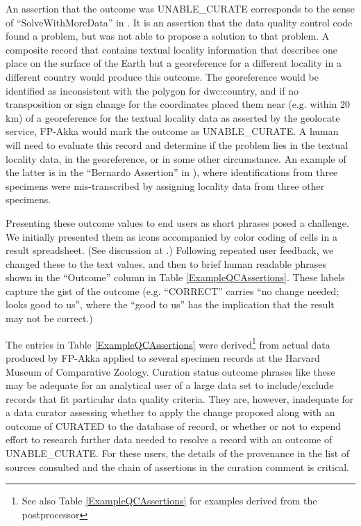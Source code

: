 \documentclass{article}
\begin{document}
An assertion that the outcome was UNABLE\_CURATE corresponds to the sense of ``SolveWithMoreData'' in \citep{morris_semantic_2013}.  It is an assertion that the data quality control code found a problem, but was not able to propose a solution to that problem.  
A composite record that contains textual locality information that describes one place on the surface of the Earth but a georeference for a different locality in a different country would produce this outcome.
The georeference would be identified as inconsistent with the polygon for dwc:country, and if no transposition or sign change for the coordinates placed them near (e.g. within 20 km) of a georeference for the textual locality data as asserted by the geolocate service, FP-Akka would mark the outcome as UNABLE\_CURATE.  
A human will need to evaluate this record and determine if the problem lies in the textual locality data, in the georeference, or in some other circumstance.
An example of the latter is in the ``Bernardo Assertion'' in \citep{morris_semantic_2013}), where identifications from three specimens were mis-transcribed by assigning locality data from three other specimens.

Presenting these outcome values to end users as short phrases posed a challenge.
We initially presented them as icons accompanied by color coding of cells in a result spreadsheet. (See discussion at \citep{FPWiki_ResultTypes}.)  Following repeated user feedback, we changed these to the text values, and then to brief human readable phrases shown in the ``Outcome'' 
column in Table \ref{ExampleQCAssertions}. %
These labels capture the gist of the outcome (e.g. ``CORRECT'' carries  ``no change needed; looks good to us'', where the ``good to us'' has the implication 
that the result may not be correct.)

The entries in Table \ref{ExampleQCAssertions} were derived\footnote{See also Table \ref{ExampleQCAssertions} for examples derived from the postprocessor} from actual data produced by FP-Akka applied to several specimen records at the Harvard Museum of Comparative Zoology.
Curation status outcome phrases like these may be adequate for an analytical user of a large data set to include/exclude records that fit particular data quality criteria.  They are, however, inadequate for a data curator assessing whether to apply the change proposed along with an outcome of CURATED to the database of record, or whether or not to expend effort to research further data needed to resolve a record with an outcome of UNABLE\_CURATE.  For these users, the details of the provenance in the list of sources consulted and the chain of assertions in the curation comment is critical.  
\end{document}

